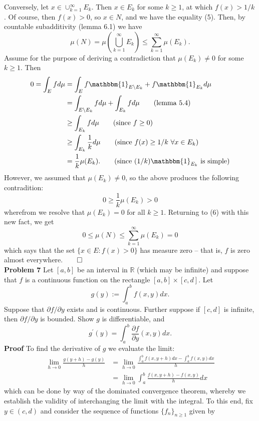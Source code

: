 \documentclass[11pt, letterpaper]{article}
\newcommand{\mbb}[1]{\mathbb{#1}}
\newcommand{\bbm}[1]{\mathbbm{#1}}
\begin{document}
    Conversely, let $x\in\cup_{k=1}^\infty E_k$. Then $x\in E_k$ for some $k\geq 1$, at which $f(x)>1/k$. Of course, then $f(x)>0$, so $x\in N$, and we have the equality (5). Then, by countable subadditivity (lemma 6.1) we have
    \[\mu(N)=\mu\left(\bigcup_{k=1}^\infty E_k\right)\leq\sum_{k=1}^\infty\mu(E_k).\tag{6}\]
    Assume for the purpose of deriving a contradiction that $\mu(E_k)\neq 0$ for some $k\geq 1$. Then 
    \begin{align*}
        0=\int_Efd\mu&=\int_Ef\bbm{1}_{E\setminus E_k}+f\bbm{1}_{E_k}d\mu\\
        &=\int_{E\setminus E_k}fd\mu+\int_{E_k}fd\mu\tag{lemma 5.4}\\
        &\geq\int_{E_k}fd\mu\tag{since $f\geq 0$}\\
        &\geq\int_{E_k}\frac{1}{k}d\mu\tag{since $f(x)\geq 1/k$ $\forall x\in E_k$}\\
        &=\frac{1}{k}\mu(E_k).\tag{since $(1/k)\bbm{1}_{E_k}$ is simple}\\
    \end{align*}
    However, we assumed that $\mu(E_k)\neq0$, so the above produces the following contradition:
    \[0\geq\frac{1}{k}\mu(E_k)>0\]
    wherefrom we resolve that $\mu(E_k)=0$ for all $k\geq 1$. Returning to (6) with this new fact, we get
    \[0\leq\mu(N)\leq\sum_{k=1}^\infty\mu(E_k)=0\]
    which says that the set $\{x\in E:f(x)>0\}$ has measure zero -- that is, $f$ is zero almost everywhere.\hfill{$\qed$}\\[10pt]
    {\bf Problem 7} Let $[a,b]$ be an interval in $\mbb{R}$ (which may be infinite) and suppose that $f$ is a continuous function on the rectangle $[a,b]\times[c,d]$.
    Let
    \[g(y):=\int_a^bf(x,y)dx.\]
    Suppose that $\partial f/\partial y$ exists and is continuous. Further suppose if $[c,d]$ is infinite, then $\partial f/\partial y$ is bounded. Show $g$ is differentiable, and 
    \[g^\prime(y)=\int_a^b\frac{\partial f}{\partial y}(x,y)dx.\]
    {\bf Proof} To find the derivative of $g$ we evaluate the limit:
    \begin{align*}
        \lim_{h\rightarrow 0}\frac{g(y+h)-g(y)}{h}&=\lim_{h\rightarrow 0}\frac{\int_a^bf(x,y+h)dx-\int_a^bf(x,y)dx}{h}\\
        &=\lim_{h\rightarrow 0}\int_a^b\frac{f(x,y+h)-f(x,y)}{h}dx
    \end{align*} 
    which can be done by way of the dominated convergence theorem, whereby we establish the validity of interchanging the limit with the integral.
    To this end, fix $y\in(c,d)$ and consider the sequence of functions $\{f_n\}_{n\geq 1}$ given by
\end{document}
